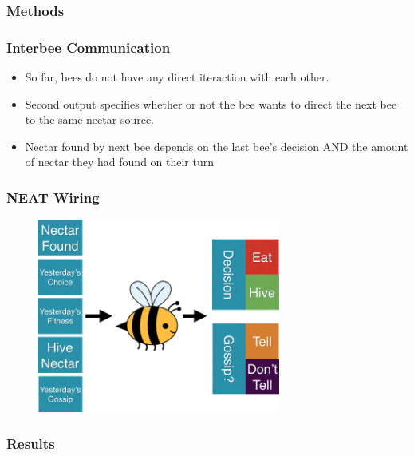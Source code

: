 \documentclass{beamer}
\begin{document}
      \subsubsection{Methods} %
      \label{ssub:methods}
        \begin{frame}[c]\frametitle{Interbee Communication}
         
          \begin{itemize}
            \item So far, bees do not have any direct iteraction with each 
                  other.
            \item Second output specifies whether or not the bee wants to
                  direct the next bee to the same nectar source.
            \item Nectar found by next bee depends on the last bee's decision
                  AND the amount of nectar they had found on their turn
          \end{itemize}
        \end{frame}  


        \begin{frame}[c]\frametitle{NEAT Wiring}
          \begin{figure}
          \includegraphics[width=8cm]{bee_diagrams/gossip_system.png}
          \end{figure}
        \end{frame}



      \subsubsection{Results} %
      \label{ssub:results}
\end{document}

